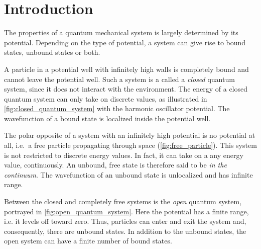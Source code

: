\documentclass[../main/report.tex]{subfiles}
\begin{document}
\chapter{Introduction}

% 

The properties of a quantum mechanical system is largely determined by its potential. 
Depending on the type of potential, a system can give rise to bound states, unbound states or both.

A particle in a potential well with infinitely high walls is completely bound and cannot leave the potential well.
Such a system is a called a \emph{closed} quantum system, since it does not interact with the environment. 
The energy of a closed quantum system can only take on discrete values, as illustrated in \cref{fig:closed_quantum_system} with the harmonic oscillator potential.
The wavefunction of a bound state is localized inside the potential well.

The polar opposite of a system with an infinitely high potential is no potential at all, i.e.~a free particle propagating through space (\cref{fig:free_particle}).
This system is not restricted to discrete energy values.
In fact, it can take on a any energy value, continuously. 
An unbound, free state is therefore said to be \emph{in the continuum}.
The wavefunction of an unbound state is unlocalized and has infinite range.

Between the closed and completely free systems is the \emph{open} quantum system, portrayed in  \cref{fig:open_quantum_system}. 
Here the potential has a finite range, i.e. it levels off toward zero.
Thus, particles can enter and exit the system and, consequently, there are unbound states. 
In addition to the unbound states, the open system can have a finite number of bound states.
\end{document}
